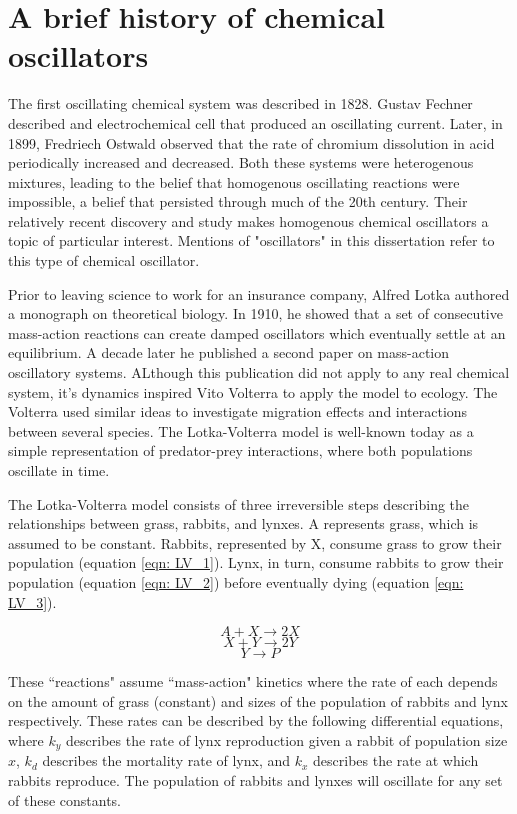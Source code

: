 \documentclass[12pt]{report}
\begin{document}
\section{A brief history of chemical oscillators}
The first oscillating chemical system was described in 1828. Gustav Fechner described and electrochemical cell that produced an oscillating current. Later, in 1899, Fredriech Ostwald observed that the rate of chromium dissolution in acid periodically increased and decreased. Both these systems were heterogenous mixtures, leading to the belief that homogenous oscillating reactions were impossible, a belief that persisted through much of the 20th century. Their relatively recent discovery and study makes homogenous chemical oscillators a topic of particular interest. Mentions of "oscillators" in this dissertation refer to this type of chemical oscillator.

Prior to leaving science to work for an insurance company, Alfred Lotka authored a monograph on theoretical biology. In 1910, he showed that a set of consecutive mass-action reactions can create damped oscillators which eventually settle at an equilibrium. A decade later he published a second paper on mass-action oscillatory systems. ALthough this publication did not apply to any real chemical system, it's dynamics inspired Vito Volterra to apply the model to ecology. The Volterra used similar ideas to investigate migration effects and interactions between several species. The Lotka-Volterra model is well-known today as a simple representation of predator-prey interactions, where both populations oscillate in time.

The Lotka-Volterra model consists of three irreversible steps describing the relationships between grass, rabbits, and lynxes. A represents grass, which is assumed to be constant. Rabbits, represented by X, consume grass to grow their population (equation \ref{eqn: LV_1}). Lynx, in turn, consume rabbits to grow their population (equation \ref{eqn: LV_2}) before eventually dying (equation \ref{eqn: LV_3}).

\begin{equation}
\label{eqn: LV_1}
A + X \to 2X
\end{equation}
\begin{equation}
\label{eqn: LV_2}
X + Y \to 2Y
\end{equation}
\begin{equation}
\label{eqn: LV_3}
Y \to P
\end{equation}

These ``reactions" assume ``mass-action" kinetics where the rate of each depends on the amount of grass (constant) and sizes of the population of rabbits and lynx respectively. These rates can be described by the following differential equations, where ${k_{y}}$ describes the rate of lynx reproduction given a rabbit of population size ${x}$, ${k_{d}}$ describes the mortality rate of lynx, and ${k_{x}}$ describes the rate at which rabbits reproduce. The population of rabbits and lynxes will oscillate for any set of these constants.
\end{document}
